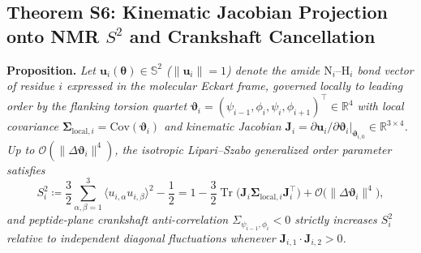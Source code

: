 \documentclass[10pt,letterpaper]{article}
\DeclareMathOperator{\Tr}{Tr}
\begin{document}
\subsection{Theorem S6: Kinematic Jacobian Projection onto NMR $S^2$ and Crankshaft Cancellation}
\textbf{Proposition.} \textit{Let $\mathbf{u}_i(\bm{\theta}) \in \mathbb{S}^2$ ($\|\mathbf{u}_i\|=1$) denote the amide $\mathrm{N}_i\text{--}\mathrm{H}_i$ bond vector of residue $i$ expressed in the molecular Eckart frame, governed locally to leading order by the flanking torsion quartet $\bm{\vartheta}_i = (\psi_{i-1},\phi_i,\psi_i,\phi_{i+1})^\top \in \mathbb{R}^4$ with local covariance $\bm{\Sigma}_{\mathrm{local},i} = \mathrm{Cov}(\bm{\vartheta}_i)$ and kinematic Jacobian $\mathbf{J}_i = \partial\mathbf{u}_i/\partial\bm{\vartheta}_i\big|_{\bm{\vartheta}_{i,0}} \in \mathbb{R}^{3\times 4}$. Up to $\mathcal{O}(\|\Delta\bm{\vartheta}_i\|^4)$, the isotropic Lipari--Szabo generalized order parameter satisfies}
\[
S^2_i \coloneqq \frac{3}{2}\sum_{\alpha,\beta=1}^3 \langle u_{i,\alpha} u_{i,\beta}\rangle^2 - \frac{1}{2} = 1 - \frac{3}{2}\Tr\!\big(\mathbf{J}_i\bm{\Sigma}_{\mathrm{local},i}\mathbf{J}_i^\top\big) + \mathcal{O}\!\big(\|\Delta\bm{\vartheta}_i\|^4\big),
\]
\textit{and peptide-plane crankshaft anti-correlation $\Sigma_{\psi_{i-1},\phi_i} < 0$ strictly increases $S^2_i$ relative to independent diagonal fluctuations whenever $\mathbf{J}_{i,1}\cdot\mathbf{J}_{i,2} > 0$.}
\end{document}

